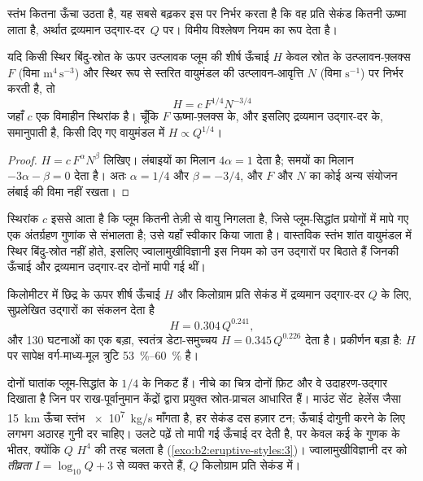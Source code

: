 स्तंभ कितना ऊँचा उठता है, यह सबसे बढ़कर इस पर निर्भर करता है कि वह प्रति सेकंड कितनी ऊष्मा
लाता है, अर्थात द्रव्यमान उद्गार-दर~$Q$ पर। विमीय विश्लेषण
नियम का रूप देता है।

\begin{proposition}[उत्प्लावक प्लूम की ऊँचाई]\label{prop:b2:eruptive-styles:plume}
यदि किसी स्थिर बिंदु-स्रोत के ऊपर उत्प्लावक प्लूम की शीर्ष ऊँचाई $H$ केवल
स्रोत के उत्प्लावन-फ़्लक्स $F$ (विमा $\mathrm{m^4\,s^{-3}}$) और
स्थिर रूप से स्तरित वायुमंडल की उत्प्लावन-आवृत्ति $N$ (विमा
$\mathrm{s^{-1}}$) पर निर्भर करती है, तो
\[
H = c\,F^{1/4}N^{-3/4}
\]
जहाँ $c$ एक विमाहीन स्थिरांक है। चूँकि $F$ ऊष्मा-फ़्लक्स के, और इसलिए
द्रव्यमान उद्गार-दर के, समानुपाती है, किसी दिए गए वायुमंडल में $H \propto Q^{1/4}$।
\end{proposition}

\begin{proof}
$H = c\,F^{\alpha}N^{\beta}$ लिखिए। लंबाइयों का मिलान $4\alpha = 1$ देता है; समयों का
मिलान $-3\alpha - \beta = 0$ देता है। अतः $\alpha = 1/4$ और $\beta = -3/4$, और
$F$ और $N$ का कोई अन्य संयोजन लंबाई की विमा नहीं रखता।
\end{proof}

स्थिरांक $c$ इससे आता है कि प्लूम कितनी तेज़ी से वायु निगलता है, जिसे प्लूम-सिद्धांत
प्रयोगों में मापे गए एक अंतर्ग्रहण गुणांक से संभालता है; उसे यहाँ स्वीकार किया
जाता है। वास्तविक स्तंभ शांत वायुमंडल में स्थिर बिंदु-स्रोत नहीं होते, इसलिए
ज्वालामुखीविज्ञानी इस नियम को उन उद्गारों पर बिठाते हैं जिनकी ऊँचाई और द्रव्यमान उद्गार-दर
दोनों मापी गई थीं।

\begin{proposition}[स्तंभ की ऊँचाई और द्रव्यमान उद्गार-दर]\label{prop:b2:eruptive-styles:mastin}
किलोमीटर में छिद्र के ऊपर शीर्ष ऊँचाई $H$ और किलोग्राम प्रति सेकंड में द्रव्यमान उद्गार-दर
$Q$ के लिए, सुप्रलेखित उद्गारों का संकलन देता है
\[
H = 0.304\,Q^{0.241},
\]
और 130 घटनाओं का एक बड़ा, स्वतंत्र डेटा-समुच्चय $H = 0.345\,Q^{0.226}$ देता है।
प्रकीर्णन बड़ा है: $H$ पर सापेक्ष वर्ग-माध्य-मूल त्रुटि
\qtyrange{53}{60}{\percent} है।
\end{proposition}
\admitted

दोनों घातांक प्लूम-सिद्धांत के $1/4$ के निकट हैं। नीचे का चित्र
दोनों फ़िट और वे उदाहरण-उद्गार दिखाता है जिन पर राख-पूर्वानुमान केंद्रों द्वारा प्रयुक्त
स्रोत-प्राचल आधारित हैं। माउंट सेंट~हेलेंस जैसा
\qty{15}{km} ऊँचा स्तंभ \qty{e7}{kg/s} माँगता है, हर सेकंड दस हज़ार टन; ऊँचाई
दोगुनी करने के लिए लगभग अठारह गुनी दर चाहिए। उलटे पढ़ें तो मापी गई ऊँचाई
दर देती है, पर केवल कई के गुणक के भीतर, क्योंकि $Q$ $H^4$ की तरह चलता है
(\cref{exo:b2:eruptive-styles:3})। ज्वालामुखीविज्ञानी दर को \emph{तीव्रता} $I =
\log_{10}Q + 3$ से व्यक्त करते हैं, $Q$ किलोग्राम प्रति सेकंड में।


